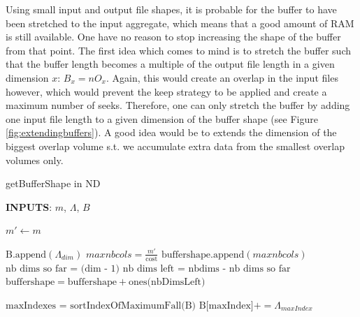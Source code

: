\documentclass[conference]{IEEEtran}
\begin{document}
Using small input and output file shapes, it is probable for the buffer to have been stretched to the input aggregate, which means that a good amount of RAM is still available.
One have no reason to stop increasing the shape of the buffer from that point.
The first idea which comes to mind is to stretch the buffer such that the buffer length becomes a multiple of the output file length in a given dimension $x$: $B_x = nO_x$.
Again, this would create an overlap in the input files however, which would prevent the keep strategy to be applied and create a maximum number of seeks.
Therefore, one can only stretch the buffer by adding one input file length to a given dimension of the buffer shape (see Figure \ref{fig:extendingbuffers}).
A good idea would be to extends the dimension of the biggest overlap volume s.t. we accumulate extra data from the smallest overlap volumes only.

\begin{algorithm}[H]
  \caption{getBufferShape in ND}

  \begin{algorithmic}[1]

    \STATE \textbf{INPUTS}: $m$, $\Lambda$, $B$

    \STATE $m' \gets m$

        \STATE $\textrm{B.append}(\Lambda_{dim})$
      \ENDIF
        \STATE $maxnbcols = \frac{m'}{\textrm{cost}}$
	      \STATE $\textrm{buffershape.append}(maxnbcols)$
      \ENDIF
        \STATE $\textrm{nb dims so far = (dim - 1)}$
        \STATE $\textrm{nb dims left = nbdims - nb dims so far}$
        \STATE $\textrm{buffershape} = \textrm{buffershape} + \textrm{ones(nbDimsLeft)}$
      \ENDIF
    \ENDFOR

    \STATE $\textrm{maxIndexes = sortIndexOfMaximumFall(B)}$ %
        \STATE $\textrm{B[maxIndex]} += \Lambda_{maxIndex}$
      \ENDWHILE
    \ENDFOR

  \end{algorithmic}
  \label{algo:getbuffershape}

\end{algorithm}
\end{document}
